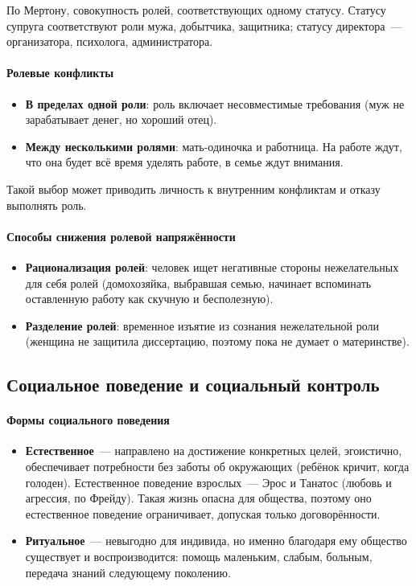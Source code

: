 \documentclass[12pt]{article}
\begin{document}
	\begin{definition}
		По Мертону, совокупность ролей, соответствующих одному статусу. Статусу супруга соответствуют роли мужа, добытчика, защитника; статусу директора~--- организатора, психолога, администратора.
	\end{definition}

	\paragraph{Ролевые конфликты}
	\begin{itemize}
		\item \textbf{В пределах одной роли}: роль включает несовместимые требования (муж не зарабатывает денег, но хороший отец).
		\item \textbf{Между несколькими ролями}: мать-одиночка и работница. На работе ждут, что она будет всё время уделять работе, в семье ждут внимания.
	\end{itemize}

	Такой выбор может приводить личность к внутренним конфликтам и отказу выполнять роль.

	\paragraph{Способы снижения ролевой напряжённости}
	\begin{itemize}
		\item \textbf{Рационализация ролей}: человек ищет негативные стороны нежелательных для себя ролей (домохозяйка, выбравшая семью, начинает вспоминать оставленную работу как скучную и бесполезную).
		\item \textbf{Разделение ролей}: временное изъятие из сознания нежелательной роли (женщина не защитила диссертацию, поэтому пока не думает о материнстве).
	\end{itemize}

	\subsection{Социальное поведение и социальный контроль}

	\paragraph{Формы социального поведения}
	\begin{itemize}
		\item \textbf{Естественное}~--- направлено на достижение конкретных целей, эгоистично, обеспечивает потребности без заботы об окружающих (ребёнок кричит, когда голоден). Естественное поведение взрослых~--- Эрос и Танатос (любовь и агрессия, по Фрейду). Такая жизнь опасна для общества, поэтому оно естественное поведение ограничивает, допуская только договорённости.
		\item \textbf{Ритуальное}~--- невыгодно для индивида, но именно благодаря ему общество существует и воспроизводится: помощь маленьким, слабым, больным, передача знаний следующему поколению.
	\end{itemize}
\end{document}
